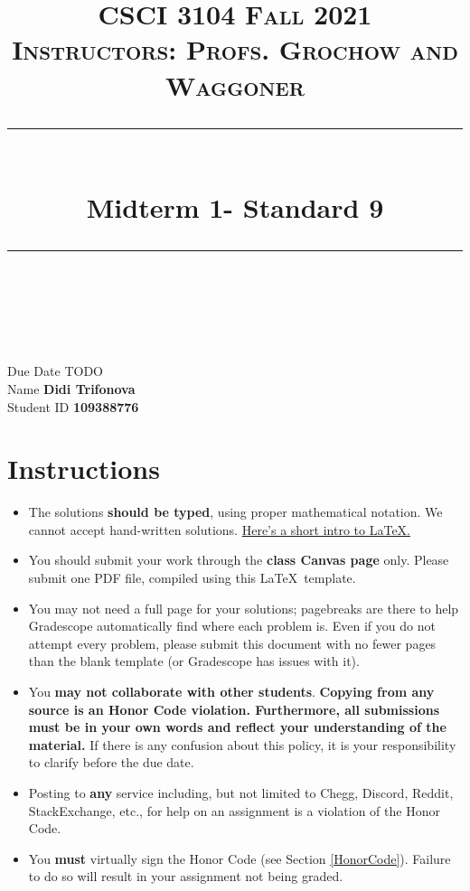 \documentclass[11pt]{article}
\title{
\normalfont \normalsize 
\textsc{CSCI 3104 Fall 2021 \\ 
Instructors: Profs. Grochow and Waggoner} \\
[10pt] 
\rule{\linewidth}{0.5pt} \\[6pt] 
\huge Midterm 1- Standard 9 \\
\rule{\linewidth}{2pt}  \\[10pt]
}
\date{}
\theoremstyle{definition}
\theoremstyle{definition}
\theoremstyle{definition}
\begin{document}

\maketitle


\noindent
Due Date \dotfill TODO \\
Name \dotfill \textbf{Didi Trifonova} \\
Student ID \dotfill \textbf{109388776} \\


\tableofcontents

\section{Instructions}
 \begin{itemize}
	\item The solutions \textbf{should be typed}, using proper mathematical notation. We cannot accept hand-written solutions. \href{http://ece.uprm.edu/~caceros/latex/introduction.pdf}{Here's a short intro to \LaTeX.}
	\item You should submit your work through the \textbf{class Canvas page} only. Please submit one PDF file, compiled using this \LaTeX \ template.
	\item You may not need a full page for your solutions; pagebreaks are there to help Gradescope automatically find where each problem is. Even if you do not attempt every problem, please submit this document with no fewer pages than the blank template (or Gradescope has issues with it).

	\item You \textbf{may not collaborate with other students}. \textbf{Copying from any source is an Honor Code violation. Furthermore, all submissions must be in your own words and reflect your understanding of the material.} If there is any confusion about this policy, it is your responsibility to clarify before the due date. 

	\item Posting to \textbf{any} service including, but not limited to Chegg, Discord, Reddit, StackExchange, etc., for help on an assignment is a violation of the Honor Code.

	\item You \textbf{must} virtually sign the Honor Code (see Section \ref{HonorCode}). Failure to do so will result in your assignment not being graded.
\end{itemize}
\end{document}
